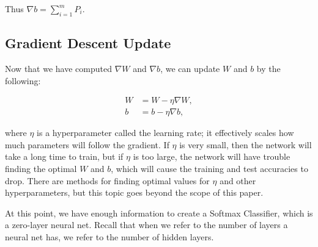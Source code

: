 Thus $\nabla b = \sum_{i=1}^m P_i$.

\subsection{Gradient Descent Update}
Now that we have computed $\nabla W$ and $\nabla b$, we can update $W$
and $b$ by the following:

\begin{align*}
W &= W - \eta \nabla W,\\
b &= b - \eta \nabla b, 
\end{align*}

where $\eta$ is a hyperparameter called the learning rate; it effectively
scales how much parameters will follow the gradient. If $\eta$ is very small,
then the network will take a long time to train, but if $\eta$ is too large,
the network will have trouble finding the optimal $W$ and $b$, which will cause
the training and test accuracies to drop. There are methods for finding optimal
values for $\eta$ and other hyperparameters, but this topic goes beyond the
scope of this paper.

At this point, we have enough information to create a Softmax Classifier, which
is a zero-layer neural net. Recall that when we refer to the
number of layers a neural net has, we refer to the number of hidden layers.
